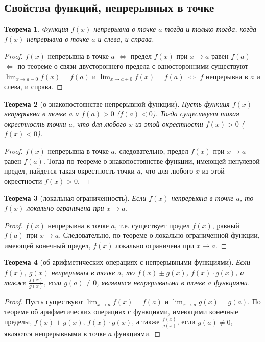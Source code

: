 \documentclass[a4paper,12pt]{article} %
\newtheorem{theorem}{Теорема}[section]
\theoremstyle{remark}
\theoremstyle{definition}
\begin{document}
\subsection{Свойства функций, непрерывных в точке}
\begin{theorem}
	Функция $f(x)$ непрерывна в точке $a$ тогда и только тогда, когда $f(x)$ непрерывна в точке $a$ и слева, и справа.
\end{theorem}
\begin{proof}
	$f(x)$ непрерывна в точке $a$ $\iff$ предел $f(x)$ при $x\to a$ равен $f(a)$ $\iff$ по теореме о связи двустороннего
    предела с односторонними существуют $\displaystyle \lim_{x \to a-0} f(x) = f(a)$ и 
    $\displaystyle \lim_{x \to a+0} f(x) = f(a)$ $\iff$ $f$ непрерывна в $a$ и слева, и справа.
\end{proof}

\begin{theorem}[о знакопостоянстве непрерывной функции]
	Пусть функция $f(x)$ непрерывна в точке $a$ и $f(a)>0$ ($f(a)<0$). Тогда существует такая окрестность точки $a$, что для любого $x$ из этой окрестности $f(x)>0$ ($f(x)<0$).
\end{theorem}
\begin{proof}
    $f(x)$ непрерывна в точке $a$, следовательно, предел $f(x)$ при $x\to a$ равен $f(a)$. Тогда по теореме о знакопостоянстве функции, имеющей ненулевой предел, найдется такая окрестность точки $a$, что для любого $x$ из этой окрестности $f(x) > 0$.
\end{proof}

\begin{theorem}[локальная ограниченность]
	Если $f(x)$ непрерывна в точке $a$, то $f(x)$ локально ограничена при $x\to a$.
\end{theorem}
\begin{proof}
    $f(x)$ непрерывна в точке $a$, т.е. существует предел $f(x)$, равный $f(a)$ при $x\to a$. Следовательно, по теореме о локально ограниченной функции, имеющей конечный предел, $f(x)$ локально ограничена при $x\to a$. 
\end{proof}

\begin{theorem}[об арифметических операциях с непрерывными функциями]
    Если $f(x)$, $g(x)$ непрерывны в точке $a$, то $f(x)\pm g(x)$, $f(x)\cdot g(x)$, а также $\frac{f(x)}{g(x)}$, если $g(a)\neq 0$, являются непрерывными в точке $a$ функциями.
\end{theorem}
\begin{proof}
    Пусть существуют $\displaystyle \lim_{x \to a} f(x) = f(a)$ и $\displaystyle \lim_{x \to a} g(x) = g(a)$. По теореме об арифметических операциях с функциями, имеющими конечные пределы, $f(x)\pm g(x)$, $f(x)\cdot g(x)$, а также $\frac{f(x)}{g(x)}$, если $g(a)\neq 0$, являются непрерывными в точке $a$ функциями.
\end{proof}
\end{document}
